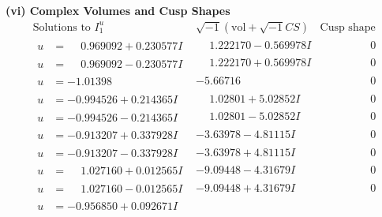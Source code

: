 \documentclass[1p]{elsarticle_modified}
\theoremstyle{definition}
\newcommand{\I}{\sqrt{-1}}
\begin{document}
\newpage\flushleft \textbf{(vi) Complex Volumes and Cusp Shapes}
$$\begin{array}{c|c|c}  
\text{Solutions to }I^u_{1}& \I (\text{vol} + \sqrt{-1}CS) & \text{Cusp shape}\\
 \hline 
\begin{aligned}
u &= \phantom{-}0.969092 + 0.230577 I\end{aligned}
 & \phantom{-}1.222170 - 0.569978 I & \phantom{-0.000000 } 0 \\ \hline\begin{aligned}
u &= \phantom{-}0.969092 - 0.230577 I\end{aligned}
 & \phantom{-}1.222170 + 0.569978 I & \phantom{-0.000000 } 0 \\ \hline\begin{aligned}
u &= -1.01398\phantom{ +0.000000I}\end{aligned}
 & -5.66716\phantom{ +0.000000I} & \phantom{-0.000000 } 0 \\ \hline\begin{aligned}
u &= -0.994526 + 0.214365 I\end{aligned}
 & \phantom{-}1.02801 + 5.02852 I & \phantom{-0.000000 } 0 \\ \hline\begin{aligned}
u &= -0.994526 - 0.214365 I\end{aligned}
 & \phantom{-}1.02801 - 5.02852 I & \phantom{-0.000000 } 0 \\ \hline\begin{aligned}
u &= -0.913207 + 0.337928 I\end{aligned}
 & -3.63978 - 4.81115 I & \phantom{-0.000000 } 0 \\ \hline\begin{aligned}
u &= -0.913207 - 0.337928 I\end{aligned}
 & -3.63978 + 4.81115 I & \phantom{-0.000000 } 0 \\ \hline\begin{aligned}
u &= \phantom{-}1.027160 + 0.012565 I\end{aligned}
 & -9.09448 - 4.31679 I & \phantom{-0.000000 } 0 \\ \hline\begin{aligned}
u &= \phantom{-}1.027160 - 0.012565 I\end{aligned}
 & -9.09448 + 4.31679 I & \phantom{-0.000000 } 0 \\ \hline\begin{aligned}
u &= -0.956850 + 0.092671 I\end{aligned}

\end{array}$$
\end{document}
